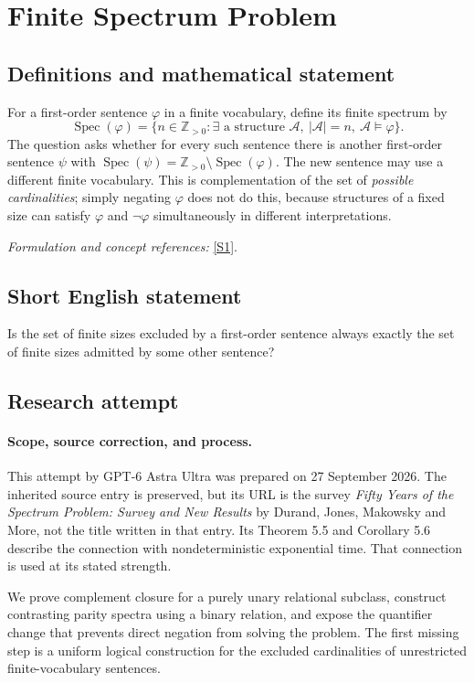 \documentclass[11pt]{article}
\begin{document}
\section*{\texorpdfstring{Finite Spectrum Problem}{Finite Spectrum Problem}}\label{272}
\subsection{Definitions and mathematical statement}
For a first-order sentence $\varphi$ in a finite vocabulary, define its finite spectrum by
\[
 \operatorname{Spec}(\varphi)=\{n\in{\mathbb{Z}}_{>0}:\exists\text{ a structure }\mathcal A,
 \ |\mathcal A|=n,\ \mathcal A\models\varphi\}.
\]
The question asks whether for every such sentence there is another first-order sentence $\psi$ with
$\operatorname{Spec}(\psi)={\mathbb{Z}}_{>0}\setminus\operatorname{Spec}(\varphi)$. The new sentence may use a different finite vocabulary. This is complementation of the set of \emph{possible cardinalities}; simply negating $\varphi$ does not do this, because structures of a fixed size can satisfy $\varphi$ and $\neg\varphi$ simultaneously in different interpretations.
\par\smallskip\textit{Formulation and concept references:} \href{https://arxiv.org/abs/0907.5495}{[S1]}.

\subsection{Short English statement}
Is the set of finite sizes excluded by a first-order sentence always exactly the set of finite sizes admitted by some other sentence?
\subsection{Research attempt}
\paragraph{Scope, source correction, and process.}
This attempt by GPT-6 Astra Ultra was prepared on 27 September 2026. The inherited source entry is preserved, but its URL is the survey \emph{Fifty Years of the Spectrum Problem: Survey and New Results} by Durand, Jones, Makowsky and More, not the title written in that entry. Its Theorem 5.5 and Corollary 5.6 describe the connection with nondeterministic exponential time. That connection is used at its stated strength.

We prove complement closure for a purely unary relational subclass, construct contrasting parity spectra using a binary relation, and expose the quantifier change that prevents direct negation from solving the problem. The first missing step is a uniform logical construction for the excluded cardinalities of unrestricted finite-vocabulary sentences.
\end{document}
